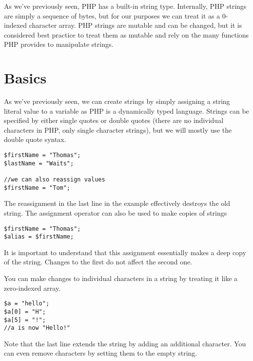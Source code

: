 

As we've previously seen, PHP has a built-in string type.
Internally, PHP strings are simply a sequence of bytes, 
but for our purposes we can treat it as a 0-indexed 
character array.  PHP strings are mutable and can be
changed, but it is considered best practice to treat
them as mutable and rely on the many functions PHP 
provides to manipulate strings.

\section{Basics}

As we've previously seen, we can create strings by
simply assigning a string literal value to a variable
as PHP is a dynamically typed language.  Strings
can be specified by either single quotes or double
quotes (there are no individual characters in PHP, 
only single character strings), but we will mostly
use the double quote syntax.

\begin{verbatim}
$firstName = "Thomas";
$lastName = "Waits";

//we can also reassign values
$firstName = "Tom";
\end{verbatim}

The reassignment in the last line in the example
effectively destroys the old string.  The assignment
operator can also be used to make copies of strings

\begin{verbatim}
$firstName = "Thomas";
$alias = $firstName;
\end{verbatim}

It is important to understand that this assignment 
essentially makes a \gls{deep copy} of the string.
Changes to the first do not affect the second one.

You can make changes to individual characters in a
string by treating it like a zero-indexed array.

\begin{verbatim}
$a = "hello";
$a[0] = "H";
$a[5] = "!";
//a is now "Hello!"
\end{verbatim}

Note that the last line extends the string by adding
an additional character.  You can even remove characters
by setting them to the empty string.

